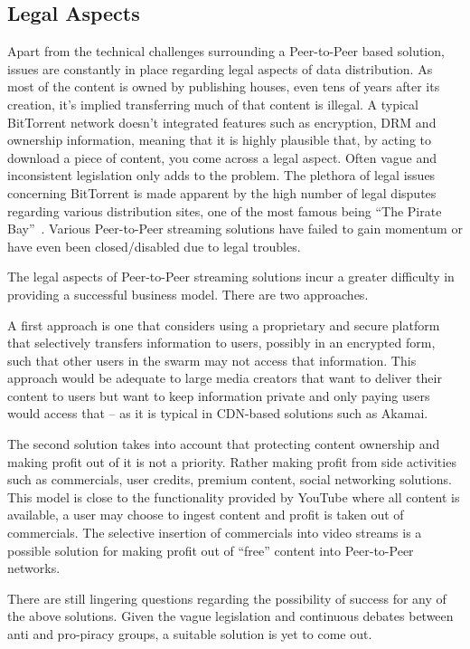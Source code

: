 \subsection{Legal Aspects}
\label{subsec:p2p-streaming-legal}

Apart from the technical challenges surrounding a Peer-to-Peer based solution,
issues are constantly in place regarding legal aspects of data distribution.
As most of the content is owned by publishing houses, even tens of years after
its creation, it's implied transferring much of that content is illegal. A
typical BitTorrent network doesn't integrated features such as encryption, DRM
and ownership information, meaning that it is highly plausible that, by acting
to download a piece of content, you come across a legal aspect. Often vague
and inconsistent legislation only adds to the problem. The plethora of legal
issues concerning BitTorrent is made apparent by the high number of legal
disputes regarding various distribution sites, one of the most famous being
``The Pirate Bay''~\cite{pirate-bay}. Various Peer-to-Peer streaming solutions have
failed to gain momentum or have even been closed/disabled due to legal
troubles.

The legal aspects of Peer-to-Peer streaming solutions incur a greater
difficulty in providing a successful business model. There are two approaches.

A first approach is one that considers using a proprietary and secure platform
that selectively transfers information to users, possibly in an encrypted
form, such that other users in the swarm may not access that information. This
approach would be adequate to large media creators that want to deliver their
content to users but want to keep information private and only paying users
would access that -- as it is typical in CDN-based solutions such as Akamai.

The second solution takes into account that protecting content ownership and
making profit out of it is not a priority. Rather making profit from side
activities such as commercials, user credits, premium content, social
networking solutions. This model is close to the functionality provided by
YouTube where all content is available, a user may choose to ingest content
and profit is taken out of commercials. The selective insertion of commercials
into video streams is a possible solution for making profit out of ``free''
content into Peer-to-Peer networks.

There are still lingering questions regarding the possibility of success for
any of the above solutions. Given the vague legislation and continuous debates
between anti and pro-piracy groups, a suitable solution is yet to come out.

